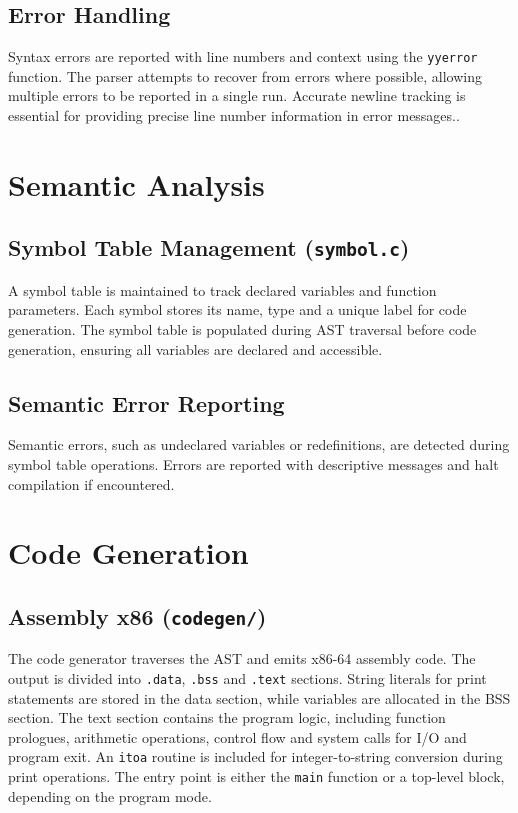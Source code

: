 \documentclass{article}
\begin{document}
    \subsection{Error Handling} 
    Syntax errors are reported with line numbers and context using the \texttt{yyerror} function. The parser attempts to recover from errors where possible, allowing multiple errors to be reported in a single run. Accurate newline tracking is essential for providing precise line number information in error messages..

\section{Semantic Analysis}
    \subsection{Symbol Table Management (\texttt{symbol.c})} 
    A symbol table is maintained to track declared variables and function parameters. Each symbol stores its name, type and a unique label for code generation. The symbol table is populated during AST traversal before code generation, ensuring all variables are declared and accessible.

    \subsection{Semantic Error Reporting} 
    Semantic errors, such as undeclared variables or redefinitions, are detected during symbol table operations. Errors are reported with descriptive messages and halt compilation if encountered.

\section{Code Generation}
    \subsection{Assembly x86 (\texttt{codegen/})} 
    The code generator traverses the AST and emits x86-64 assembly code. The output is divided into \texttt{.data}, \texttt{.bss} and \texttt{.text} sections. String literals for print statements are stored in the data section, while variables are allocated in the BSS section. The text section contains the program logic, including function prologues, arithmetic operations, control flow and system calls for I/O and program exit. An \texttt{itoa} routine is included for integer-to-string conversion during print operations. The entry point is either the \texttt{main} function or a top-level block, depending on the program mode.
\end{document}
